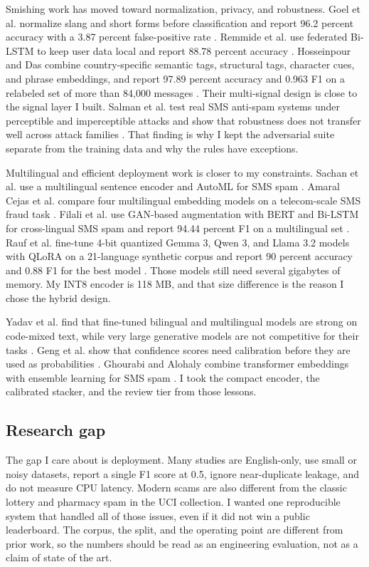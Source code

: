 \documentclass[11pt]{article}
\begin{document}
Smishing work has moved toward normalization, privacy, and robustness. Goel et al. normalize slang and short forms before classification and report 96.2 percent accuracy with a 3.87 percent false-positive rate \cite{goel2024}. Remmide et al. use federated Bi-LSTM to keep user data local and report 88.78 percent accuracy \cite{remmide2025}. Hosseinpour and Das combine country-specific semantic tags, structural tags, character cues, and phrase embeddings, and report 97.89 percent accuracy and 0.963 F1 on a relabeled set of more than 84,000 messages \cite{hosseinpour2025}. Their multi-signal design is close to the signal layer I built. Salman et al. test real SMS anti-spam systems under perceptible and imperceptible attacks and show that robustness does not transfer well across attack families \cite{salman2026}. That finding is why I kept the adversarial suite separate from the training data and why the rules have exceptions.

Multilingual and efficient deployment work is closer to my constraints. Sachan et al. use a multilingual sentence encoder and AutoML for SMS spam \cite{sachan2025}. Amaral Cejas et al. compare four multilingual embedding models on a telecom-scale SMS fraud task \cite{amaral2026}. Filali et al. use GAN-based augmentation with BERT and Bi-LSTM for cross-lingual SMS spam and report 94.44 percent F1 on a multilingual set \cite{filali2026}. Rauf et al. fine-tune 4-bit quantized Gemma 3, Qwen 3, and Llama 3.2 models with QLoRA on a 21-language synthetic corpus and report 90 percent accuracy and 0.88 F1 for the best model \cite{rauf2026}. Those models still need several gigabytes of memory. My INT8 encoder is 118 MB, and that size difference is the reason I chose the hybrid design.

Yadav et al. find that fine-tuned bilingual and multilingual models are strong on code-mixed text, while very large generative models are not competitive for their tasks \cite{yadav2024}. Geng et al. show that confidence scores need calibration before they are used as probabilities \cite{geng2024}. Ghourabi and Alohaly combine transformer embeddings with ensemble learning for SMS spam \cite{ghourabi2023}. I took the compact encoder, the calibrated stacker, and the review tier from those lessons.

\subsection{Research gap}

The gap I care about is deployment. Many studies are English-only, use small or noisy datasets, report a single F1 score at 0.5, ignore near-duplicate leakage, and do not measure CPU latency. Modern scams are also different from the classic lottery and pharmacy spam in the UCI collection. I wanted one reproducible system that handled all of those issues, even if it did not win a public leaderboard. The corpus, the split, and the operating point are different from prior work, so the numbers should be read as an engineering evaluation, not as a claim of state of the art.
\end{document}
